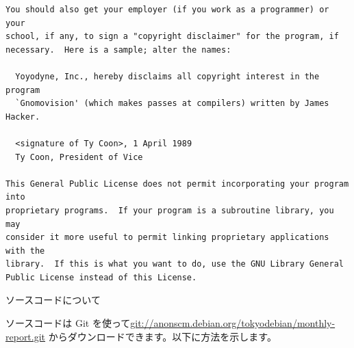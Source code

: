 \documentclass[mingoth,a4paper]{jsarticle}
\begin{document}
\begin{multicols}{2}
\begin{fontsize}{6}{6}
\begin{verbatim}
You should also get your employer (if you work as a programmer) or your
school, if any, to sign a "copyright disclaimer" for the program, if
necessary.  Here is a sample; alter the names:

  Yoyodyne, Inc., hereby disclaims all copyright interest in the program
  `Gnomovision' (which makes passes at compilers) written by James Hacker.

  <signature of Ty Coon>, 1 April 1989
  Ty Coon, President of Vice

This General Public License does not permit incorporating your program into
proprietary programs.  If your program is a subroutine library, you may
consider it more useful to permit linking proprietary applications with the
library.  If this is what you want to do, use the GNU Library General
Public License instead of this License.
 \end{verbatim}
 \end{fontsize}
\end{multicols}

\begin{center}
ソースコードについて
\end{center}

ソースコードは Git を使って\url{git://anonscm.debian.org/tokyodebian/monthly-report.git}
からダウンロードできます。以下に方法を示します。


\newpage
\end{document}
